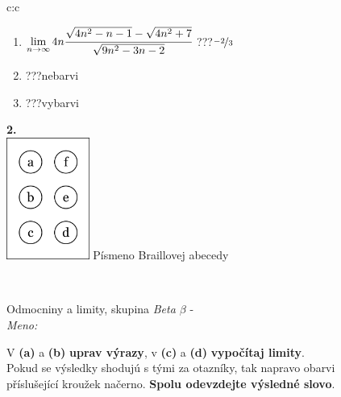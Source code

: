 \documentclass[10pt]{report}
\begin{document}
\begin{tabular}{c:c}
\begin{minipage}[c][104.5mm][t]{0.5\linewidth}
\begin{center}
\begin{minipage}{0.79\linewidth}
\begin{center}
\begin{varwidth}{\linewidth}
\begin{enumerate}
\item $\lim\limits_{n\to\infty}4n\cfrac{\sqrt{4n^2-n-1}-\sqrt{4n^2+7}}{\sqrt{9n^2-3n-2}}$\quad \dotfill\; ???\;\dotfill \quad $\nicefrac{-2}{3}$
\item \quad \dotfill\; ???\;\dotfill \quad nebarvi
\item \quad \dotfill\; ???\;\dotfill \quad vybarvi
\end{enumerate}
\end{varwidth}
\end{center}
\end{minipage}
\begin{minipage}{0.20\linewidth}
\begin{center}
{\Huge\bfseries 2.} \\[2mm]
\includegraphics[height=40mm]{../images/braille.png}
{\small Písmeno Braillovej abecedy}
\end{center}
\end{minipage}
\end{center}
\end{minipage}
\\ \hdashline
\begin{minipage}[c][104.5mm][t]{0.5\linewidth}
\begin{center}
\vspace{7mm}
{\huge Odmocniny a limity, skupina \textit{Beta $\beta$} -}\\[5mm]
\textit{Meno:}\phantom{xxxxxxxxxxxxxxxxxxxxxxxxxxxxxxxxxxxxxxxxxxxxxxxxxxxxxxxxxxxxxxxxx}\\[5mm]
\begin{minipage}{0.95\linewidth}
\begin{center}
V \textbf{(a)} a \textbf{(b)} \textbf{uprav výrazy}, v \textbf{(c)} a \textbf{(d)} \textbf{vypočítaj limity}.\\Pokud se výsledky shodujú s tými za otazníky, tak napravo obarvi\\příslušející kroužek načerno. \textbf{Spolu odevzdejte výsledné slovo}.
\end{center}
\end{minipage}
\\[1mm]

\end{center}
\end{minipage}
\end{tabular}
\end{document}
